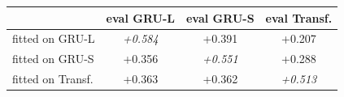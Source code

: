 \begin{tabular}{lccc}
\toprule
& eval GRU-L & eval GRU-S & eval Transf. \\
\midrule
fitted on GRU-L & \emph{+0.584} & +0.391 & +0.207 \\
fitted on GRU-S & +0.356 & \emph{+0.551} & +0.288 \\
fitted on Transf. & +0.363 & +0.362 & \emph{+0.513} \\
\bottomrule
\end{tabular}